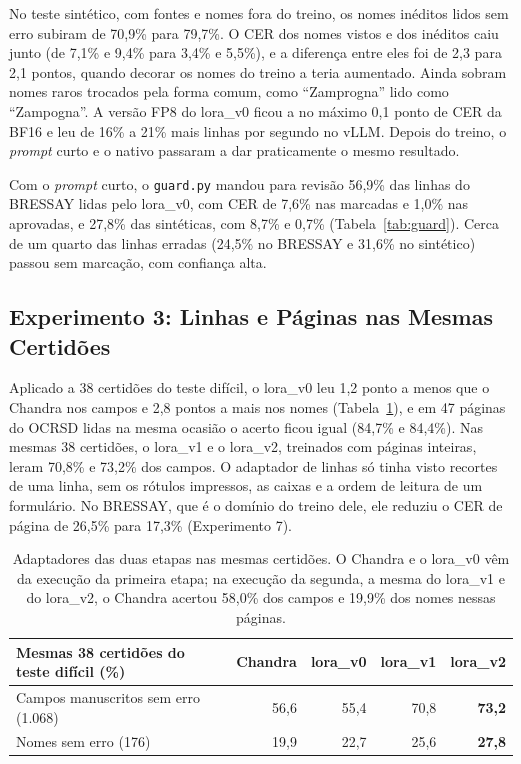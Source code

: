 No teste sintético, com fontes e nomes fora do treino, os nomes inéditos lidos sem erro subiram de 70,9\% para 79,7\%. O CER dos nomes vistos e dos inéditos caiu junto (de 7,1\% e 9,4\% para 3,4\% e 5,5\%), e a diferença entre eles foi de 2,3 para 2,1 pontos, quando decorar os nomes do treino a teria aumentado. Ainda sobram nomes raros trocados pela forma comum, como ``Zamprogna'' lido como ``Zampogna''. A versão FP8 do lora\_v0 ficou a no máximo 0,1 ponto de CER da BF16 e leu de 16\% a 21\% mais linhas por segundo no vLLM. Depois do treino, o \emph{prompt} curto e o nativo passaram a dar praticamente o mesmo resultado.

Com o \emph{prompt} curto, o \texttt{guard.py} mandou para revisão 56,9\% das linhas do BRESSAY lidas pelo lora\_v0, com CER de 7,6\% nas marcadas e 1,0\% nas aprovadas, e 27,8\% das sintéticas, com 8,7\% e 0,7\% (Tabela~\ref{tab:guard}). Cerca de um quarto das linhas erradas (24,5\% no BRESSAY e 31,6\% no sintético) passou sem marcação, com confiança alta.

\subsection{Experimento 3: Linhas e Páginas nas Mesmas Certidões}
\label{subsec:linhas-paginas}

Aplicado a 38 certidões do teste difícil, o lora\_v0 leu 1,2 ponto a menos que o Chandra nos campos e 2,8 pontos a mais nos nomes (Tabela~\ref{tab:linhas-paginas}), e em 47 páginas do OCRSD lidas na mesma ocasião o acerto ficou igual (84,7\% e 84,4\%). Nas mesmas 38 certidões, o lora\_v1 e o lora\_v2, treinados com páginas inteiras, leram 70,8\% e 73,2\% dos campos. O adaptador de linhas só tinha visto recortes de uma linha, sem os rótulos impressos, as caixas e a ordem de leitura de um formulário. No BRESSAY, que é o domínio do treino dele, ele reduziu o CER de página de 26,5\% para 17,3\% (Experimento 7).

\begin{table}[H]
\centering
\small
\begin{tabular}{@{}lrrrr@{}}
\toprule
Mesmas 38 certidões do teste difícil (\%) & Chandra & lora\_v0 & lora\_v1 & lora\_v2 \\
\midrule
Campos manuscritos sem erro (1.068) & 56,6 & 55,4 & 70,8 & \textbf{73,2} \\
Nomes sem erro (176) & 19,9 & 22,7 & 25,6 & \textbf{27,8} \\
\bottomrule
\end{tabular}
\caption{Adaptadores das duas etapas nas mesmas certidões. O Chandra e o lora\_v0 vêm da execução da primeira etapa; na execução da segunda, a mesma do lora\_v1 e do lora\_v2, o Chandra acertou 58,0\% dos campos e 19,9\% dos nomes nessas páginas.}
\label{tab:linhas-paginas}
\end{table}

